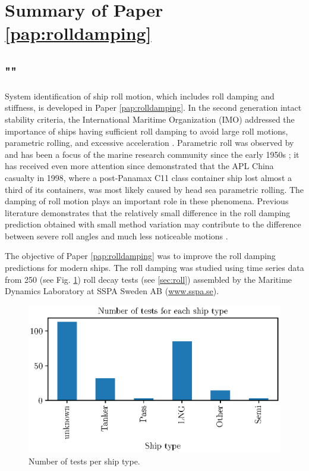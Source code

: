 \section{Summary of Paper \ref{pap:rolldamping}}
\subsection*{""}
System identification of ship roll motion, which includes roll damping and stiffness, is developed in Paper \ref{pap:rolldamping}. In the second generation intact stability criteria, the International Maritime Organization (IMO) addressed the importance of ships having sufficient roll damping to avoid large roll motions, parametric rolling, and excessive acceleration \parencite{imo_finalization_2016}. Parametric roll was observed by \parencite{froude_rolling_1861} and has been a focus of the marine research community since the early 1950s \parencite{galeazzi_early_2013}; it has received even more attention since \parencite{france_investigation_2001} demonstrated that the APL China casualty in 1998, where a post-Panamax C11 class container ship lost almost a third of its containers, was most likely caused by head sea parametric rolling. The damping of roll motion plays an important role in these phenomena. Previous literature demonstrates that the relatively small difference in the roll damping prediction obtained with small method variation may contribute to the difference between severe roll angles and much less noticeable motions \parencite{soder_ikeda_2019}.

The objective of Paper \ref{pap:rolldamping} was to improve the roll damping predictions for modern ships. The roll damping was studied using time series data from 250 (see Fig. \ref{fig:ship_types}) roll decay tests (see \autoref{sec:roll}) assembled by the Maritime Dynamics Laboratory at SSPA Sweden AB (\href{www.sspa.se}{www.sspa.se}).

\begin{figure}[!htb]
    \centering
    \includegraphics[width=0.6\columnwidth]{kappa/images/ship_types.eps}
    \caption{Number of tests per ship type.}
    \label{fig:ship_types}
\end{figure}

